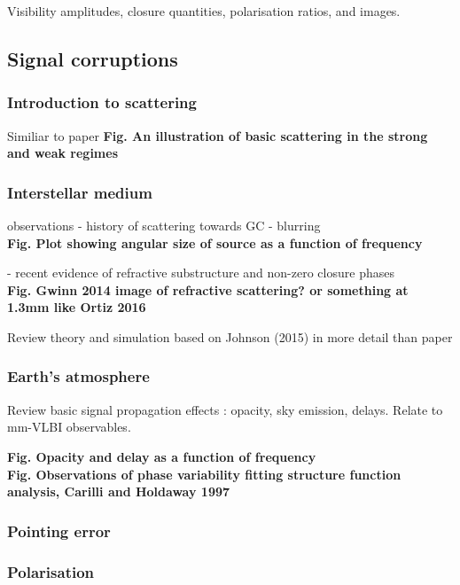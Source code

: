 \documentclass{article}
\begin{document}
Visibility amplitudes, closure quantities, polarisation ratios, and images. 

\subsection{Signal corruptions}

\subsubsection{Introduction to scattering}
Similiar to paper
{\bf Fig. An illustration of basic scattering in the strong and weak regimes}

\subsubsection{Interstellar medium}

observations - history of scattering towards GC - blurring\\
                         {\bf Fig. Plot showing angular size of source as a function of frequency}

                          - recent evidence of refractive substructure and non-zero closure phases\\
                         {\bf Fig. Gwinn 2014 image of refractive scattering? or something at 1.3mm like Ortiz 2016}
                         
Review theory and simulation based on Johnson (2015) in more detail than paper

\subsubsection{Earth's atmosphere}

Review basic signal propagation effects : opacity, sky emission, delays. Relate to mm-VLBI observables.

{\bf Fig. Opacity and delay as a function of frequency}\\

{\bf Fig. Observations of phase variability fitting structure function analysis, Carilli and Holdaway 1997}\\


\subsubsection{Pointing error}
\subsubsection{Polarisation}
\end{document}
